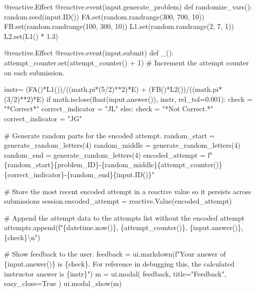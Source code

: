 \documentclass[
  letterpaper,
  DIV=11,
  numbers=noendperiod]{scrreprt}
\newenvironment{Shaded}{\begin{snugshade}}{\end{snugshade}}
\newcommand{\NormalTok}[1]{\textcolor[rgb]{0.00,0.23,0.31}{#1}}
\begin{document}
\begin{Shaded}
\begin{Highlighting}[]
\NormalTok{    @reactive.Effect}
\NormalTok{    @reactive.event(input.generate\_problem)}
\NormalTok{    def randomize\_vars():}
\NormalTok{        random.seed(input.ID())}
\NormalTok{        FA.set(random.randrange(300, 700, 10))}
\NormalTok{        FB.set(random.randrange(100, 300, 10))}
\NormalTok{        L1.set(random.randrange(2, 7, 1))}
\NormalTok{        L2.set(L1() * 1.3)}
        

\NormalTok{    @reactive.Effect}
\NormalTok{    @reactive.event(input.submit)}
\NormalTok{    def \_():}
\NormalTok{        attempt\_counter.set(attempt\_counter() + 1)  \# Increment the attempt counter on each submission.}
    
\NormalTok{        instr= (FA()*L1())/((math.pi*(5/2)**2)*E) + (FB()*L2())/((math.pi*(3/2)**2)*E)}
\NormalTok{        if math.isclose(float(input.answer()), instr, rel\_tol=0.001):}
\NormalTok{            check = "*Correct*"}
\NormalTok{            correct\_indicator = "JL"}
\NormalTok{        else:}
\NormalTok{            check = "*Not Correct.*"}
\NormalTok{            correct\_indicator = "JG"}

\NormalTok{        \# Generate random parts for the encoded attempt.}
\NormalTok{        random\_start = generate\_random\_letters(4)}
\NormalTok{        random\_middle = generate\_random\_letters(4)}
\NormalTok{        random\_end = generate\_random\_letters(4)}
\NormalTok{        encoded\_attempt = f"\{random\_start\}\{problem\_ID\}{-}\{random\_middle\}\{attempt\_counter()\}\{correct\_indicator\}{-}\{random\_end\}\{input.ID()\}"}

\NormalTok{        \# Store the most recent encoded attempt in a reactive value so it persists across submissions}
\NormalTok{        session.encoded\_attempt = reactive.Value(encoded\_attempt)}

\NormalTok{        \# Append the attempt data to the attempts list without the encoded attempt}
\NormalTok{        attempts.append(f"\{datetime.now()\}, \{attempt\_counter()\}, \{input.answer()\}, \{check\}\textbackslash{}n")}

\NormalTok{        \# Show feedback to the user.}
\NormalTok{        feedback = ui.markdown(f"Your answer of \{input.answer()\} is \{check\}. For reference in debugging this, the calculated instructor answer is \{instr\}")}
\NormalTok{        m = ui.modal(}
\NormalTok{            feedback,}
\NormalTok{            title="Feedback",}
\NormalTok{            easy\_close=True}
\NormalTok{        )}
\NormalTok{        ui.modal\_show(m)}


\end{Highlighting}
\end{Shaded}
\end{document}

